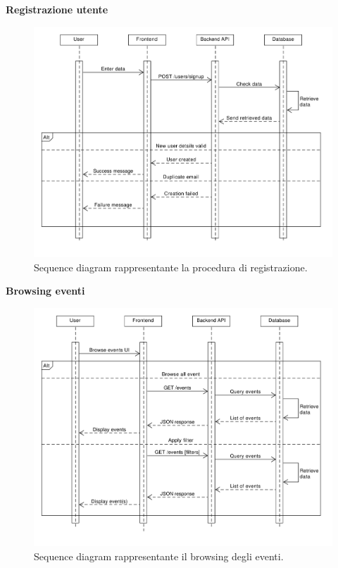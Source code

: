 \documentclass[9pt]{extarticle}
\begin{document}
\newpage
\textbf{Registrazione utente}
\begin{figure}[!htb]
	\centering
	\includegraphics[width=\linewidth]{./images/SequenceDiagramRegistration.pdf}
	\caption{Sequence diagram rappresentante la procedura di registrazione.}
	\label{fig:SeqDiagReg}
\end{figure}

\newpage
\textbf{Browsing eventi}
\begin{figure}[!htb]
	\centering
	\includegraphics[width=\linewidth]{./images/SequenceDiagramBrowseEvents.pdf}
	\caption{Sequence diagram rappresentante il browsing degli eventi.}
	\label{fig:SeqDiagBrowseEvents}
\end{figure}
\end{document}
